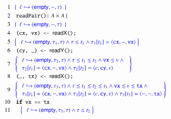 \begin{wrapfigure}{r}{0.5\textwidth}
\begin{align*}
{\scriptsize
\begin{array}{r@{\ \ \ }l@{\ }l}
 \Num{1} & \spec{~~\histso{\hps}{\hempty, -, \hist}~~} & 
  \\[1pt]
  \Num{2} &  ~\esc{readPair():}~ A \times A~\{ & 
  \\[1pt]
 \Num{3}  & \spec{~~\histso{\hps}{\hempty, -, \hist}~~} & 
  \\[1pt]
 \Num{4} &  ~\esc{(cx, vx) <- \act{readX}();}  & 
  \\[1pt]
 \Num{5} & \spec{
    \begin{array}{l@{\ }l}
     \histso{\hps}{\hempty, \hist_1, \hist} \aand \hist \le t_1 \aand 
     \inat{\angled{\esc{cx}, -, \esc{vx}}}{\hist_1}{t_1}
    \end{array}
  } &
  \\[1pt]
  \Num{6} &  ~\esc{(cy, \_) <- \act{readY}();} & 
  \\[1.5pt]
  \Num{7} & \spec{
    \def\arraystretch{1.2}
    \begin{array}{l}
    \histso{\hps}{\hempty, \hist_2, \hist} \aand \hist \le t_1 \le t_2 \aand \esc{vx} \le v \aand \hbox{} \\
    \inat{\angled{\esc{cx}, -, \esc{vx}}}{\hist_2}{t_1} \aand
    \inat{\angled{c, \esc{cy}, v}}{\hist_2}{t_2}   
    \end{array}
  } & 
  \\[1.5pt]
\Num{8} &  ~\esc{(\_, tx) <- \act{readX}();} & 
  \\[1.5pt]
 \Num{9} & \spec{
    \def\arraystretch{1.2}
    \begin{array}{l@{\ }l}
      \histso{\hps}{\hempty, \hist_3, \hist} \aand \hist \le t_1 \le t_2 \le t_3 \aand \esc{vx}\le v \le \esc{tx} \aand \hbox{}\\
      \inat{\angled{\esc{cx}, -, \esc{vx}}}{\hist_3}{t_1}  \aand
      \inat{\angled{c, \esc{cy}, v}}{\hist_3}{t_2} \aand \inat{\angled{-, -, \esc{tx}}}{\hist_3}{t_3} \\
    \end{array}
  } & 
  \\[1.5pt]
  \Num{10} &  ~\esc{\textbf{if} vx == tx} \\
 \Num{11} & \quad\spec{
    \begin{array}{l@{\ }l}
      \histso{\hps}{\hempty, \hist_3, \hist} \aand \hist \le t_2

\end{array}}
\end{array}}
\end{align*}
\end{wrapfigure}
